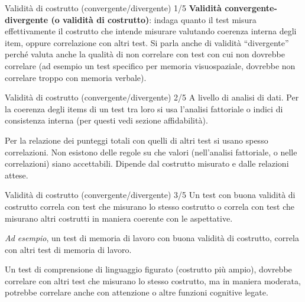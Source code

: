 \documentclass[
  ignorenonframetext,
]{beamer}
\begin{document}
\begin{frame}{Validità di costrutto (convergente/divergente) 1/5}
\label{validituxe0-di-costrutto-convergentedivergente-15}
\textbf{Validità convergente-divergente (o validità di costrutto)}:
indaga quanto il test misura effettivamente il costrutto che intende
misurare valutando coerenza interna degli item, oppure correlazione con
altri test. Si parla anche di validità ``divergente'' perché valuta
anche la qualità di non correlare con test con cui non dovrebbe
correlare (ad esempio un test specifico per memoria visuospaziale,
dovrebbe non correlare troppo con memoria verbale).
\end{frame}

\begin{frame}{Validità di costrutto (convergente/divergente) 2/5}
\label{validituxe0-di-costrutto-convergentedivergente-25}
A livello di analisi di dati. Per la coerenza degli items di un test tra
loro si usa l'analisi fattoriale o indici di consistenza interna (per
questi vedi sezione affidabilità).

\vfill

Per la relazione dei punteggi totali con quelli di altri test si usano
spesso correlazioni. Non esistono delle regole su che valori
(nell'analisi fattoriale, o nelle correlazioni) siano accettabili.
Dipende dal costrutto misurato e dalle relazioni attese.
\end{frame}

\begin{frame}{Validità di costrutto (convergente/divergente) 3/5}
\label{validituxe0-di-costrutto-convergentedivergente-35}
Un test con buona validità di costrutto correla con test che misurano lo
stesso costrutto o correla con test che misurano altri costrutti in
maniera coerente con le aspettative.

\emph{Ad esempio}, un test di memoria di lavoro con buona validità di
costrutto, correla con altri test di memoria di lavoro.

Un test di comprensione di linguaggio figurato (costrutto più ampio),
dovrebbe correlare con altri test che misurano lo stesso costrutto, ma
in maniera moderata, potrebbe correlare anche con attenzione o altre
funzioni cognitive legate.
\end{frame}
\end{document}
